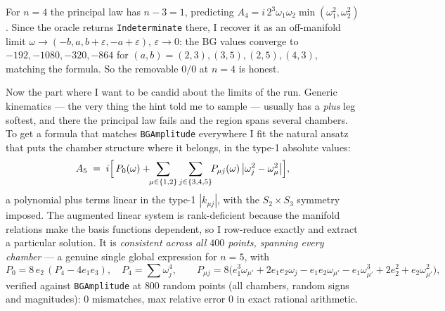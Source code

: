 \documentclass{article}
\begin{document}
For $n=4$ the principal law has $n-3=1$, predicting
$A_4=i\,2^{3}\omega_1\omega_2\min(\omega_1^2,\omega_2^2)$. Since the oracle returns
\texttt{Indeterminate} there, I recover it as an off-manifold limit
$\omega\to(-b,a,b+\varepsilon,-a+\varepsilon)$, $\varepsilon\to0$: the BG values
converge to $-192,-1080,-320,-864$ for $(a,b)=(2,3),(3,5),(2,5),(4,3)$, matching
the formula. So the removable $0/0$ at $n=4$ is honest.

Now the part where I want to be candid about the limits of the run. Generic
kinematics --- the very thing the hint told me to sample --- usually has a
\emph{plus} leg softest, and there the principal law fails and the region spans
several chambers. To get a formula that matches \texttt{BGAmplitude} everywhere I
fit the natural ansatz that puts the chamber structure where it belongs, in the
type-1 absolute values:
\[
A_5 \;=\; i\Bigl[\,P_0(\omega)+\!\!\sum_{\mu\in\{1,2\}}\sum_{j\in\{3,4,5\}}\!\!
P_{\mu j}(\omega)\,\bigl|\omega_j^2-\omega_\mu^2\bigr|\Bigr],
\]
a polynomial plus terms linear in the type-1 $|k_{\mu j}|$, with the $S_2\times
S_3$ symmetry imposed. The augmented linear system is rank-deficient because the
manifold relations make the basis functions dependent, so I row-reduce exactly and
extract a particular solution. It is \emph{consistent across all $400$ points,
spanning every chamber} --- a genuine single global expression for $n=5$, with
\[
P_0=8\,e_2\,(P_4-4e_1e_3),\quad P_4=\textstyle\sum\omega_j^4,\qquad
P_{\mu j}=8\bigl(e_1^3\omega_{\mu'}+2e_1e_2\omega_j-e_1e_2\omega_{\mu'}
-e_1\omega_{\mu'}^3+2e_2^2+e_2\omega_{\mu'}^2\bigr),
\]
verified against \texttt{BGAmplitude} at $800$ random points (all chambers, random
signs and magnitudes): $0$ mismatches, max relative error $0$ in exact rational
arithmetic.
\end{document}

